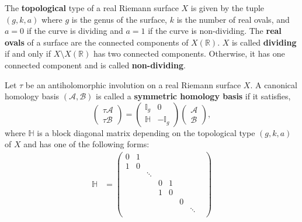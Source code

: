 \begin{definition} \label{def:topological-type} The {\bf topological} type of a
  real Riemann surface $X$ is given by the tuple $(g, k, a)$ where $g$ is the
  genus of the surface, $k$ is the number of real ovals, and $a = 0$ if the
  curve is dividing and $a = 1$ if the curve is non-dividing. The {\bf real
    ovals} of a surface are the connected components of $X(\mathbb{R})$. $X$ is
  called {\bf dividing} if and only if $X \setminus X(\mathbb{R})$ has two
  connected components. Otherwise, it has one connected component and is called
  {\bf non-dividing}.
\end{definition}

\begin{definition} \label{def:symmetric-homology-basis} Let $\tau$ be an
  antiholomorphic involution on a real Riemann surface $X$. A canonical homology
  basis $(\mathcal{A}, \mathcal{B})$ is called a {\bf symmetric homology basis}
  if it satisfies,
  \begin{equation}
    \begin{pmatrix} \tau \mathcal{A} \\ \tau \mathcal{B} \end{pmatrix}
    =
    \begin{pmatrix}
      \mathbb{I}_g & 0 \\
      \mathbb{H} & -\mathbb{I}_g
    \end{pmatrix}
    \begin{pmatrix} \mathcal{A} \\ \mathcal{B} \end{pmatrix},
  \end{equation}
  where $\mathbb{H}$ is a block diagonal matrix depending on the topological
  type $(g, k, a)$ of $X$ and has one of the following forms:
  \begin{align}
    \mathbb{H} &= \begin{pmatrix}
      0 & 1 &        &   &   &   &        &   \\
      1 & 0 &        &   &   &   &        &   \\
        &   & \ddots &   &   &   &        &   \\
        &   &        & 0 & 1 &   &        &   \\
        &   &        & 1 & 0 &   &        &   \\
        &   &        &   &   & 0 &        &   \\
        &   &        &   &   &   & \ddots &   \\

\end{pmatrix}
\end{align}
\end{definition}

